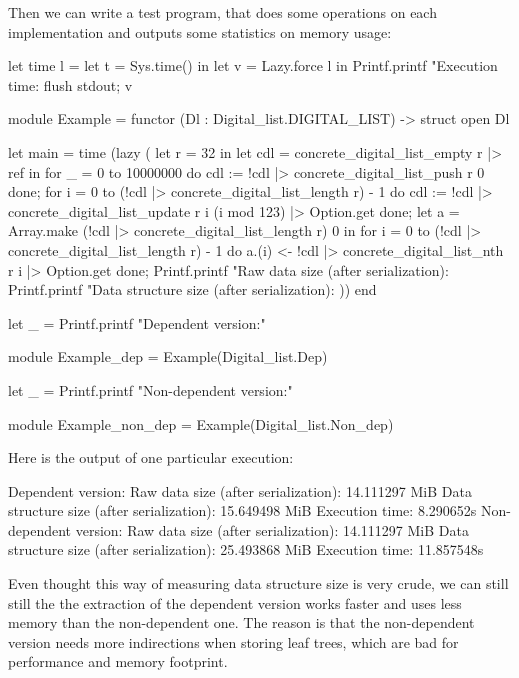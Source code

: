 \documentclass{article}
\begin{document}
Then we can write a test program, that does some operations on each implementation and outputs some statistics on memory usage:

\begin{coq}
let time l =
  let t = Sys.time() in
  let v = Lazy.force l in
  Printf.printf "Execution time: %
  flush stdout;
  v

module Example = functor (Dl : Digital_list.DIGITAL_LIST) -> struct
  open Dl

  let main =
    time (lazy (
      let r = 32 in
      let cdl = concrete_digital_list_empty r |> ref in
      for _ = 0 to 10000000 do
        cdl := !cdl |> concrete_digital_list_push r 0
      done;
      for i = 0 to (!cdl |> concrete_digital_list_length r) - 1 do
        cdl := !cdl |> concrete_digital_list_update r i (i mod 123) |> Option.get
      done;
      let a = Array.make (!cdl |> concrete_digital_list_length r) 0 in
      for i = 0 to (!cdl |> concrete_digital_list_length r) - 1 do
        a.(i) <- !cdl |> concrete_digital_list_nth r i |> Option.get
      done;
      Printf.printf "Raw data size (after serialization): %
      Printf.printf "Data structure size (after serialization): %
    ))
end

let _ = Printf.printf "Dependent version:\n"

module Example_dep = Example(Digital_list.Dep)

let _ = Printf.printf "Non-dependent version:\n"

module Example_non_dep = Example(Digital_list.Non_dep)
\end{coq}

Here is the output of one particular execution:

\begin{coq}
Dependent version:
Raw data size (after serialization): 14.111297 MiB
Data structure size (after serialization): 15.649498 MiB
Execution time: 8.290652s
Non-dependent version:
Raw data size (after serialization): 14.111297 MiB
Data structure size (after serialization): 25.493868 MiB
Execution time: 11.857548s
\end{coq}

Even thought this way of measuring data structure size is very crude, we can still still the the extraction of the dependent version works faster and uses less memory than the non-dependent one. The reason is that the non-dependent version needs more indirections when storing leaf trees, which are bad for performance and memory footprint.
\end{document}
